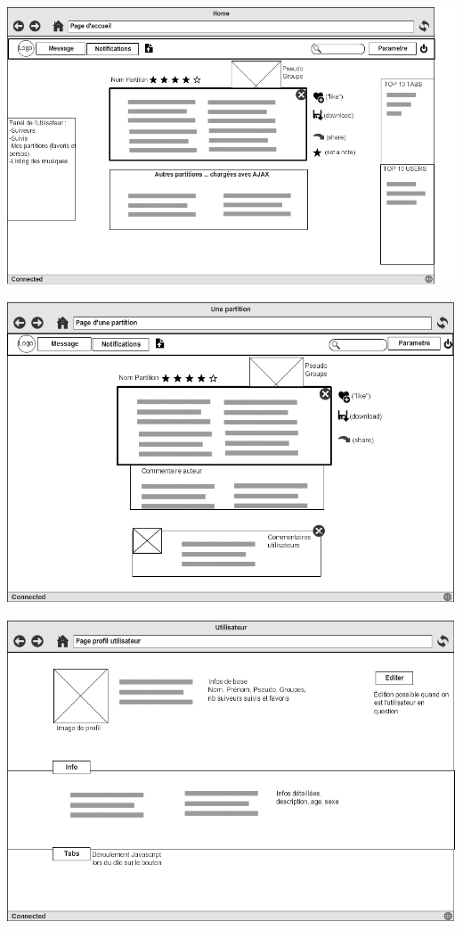\documentclass[a4paper]{article}
\begin{document}
\centerline{\includegraphics[scale=0.6]{Home}}
\centerline{\includegraphics[scale=0.6]{Tab}}
\centerline{\includegraphics[scale=0.6]{User}}
\end{document}
